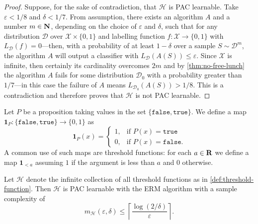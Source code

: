 \begin{proof}
    Suppose, for the sake of contradiction, that \(\mathcal{H}\) is PAC learnable. Take
    \(\varepsilon < 1/8\) and \(\delta < 1/7\). From assumption, there exists an algorithm
    \(A\) and a number \(m \in \mathbf{N}\), depending on the choice of \(\varepsilon\) and
    \(\delta\), such that for any distribution \(\mathcal{D}\) over
    \(\mathcal{X} \times \{0, 1\}\) and labelling function
    \(f: \mathcal{X} \to \{0, 1\}\) with \(L_{\mathcal{D}}(f) = 0\)---then, with a probability of at least
    \(1 - \delta\) over a sample \(S \sim \mathcal{D}^m\), the algorithm \(A\) will output a
    classifier with \(L_{\mathcal{D}}(A(S)) \leq \varepsilon\). Since
    \(\mathcal{X}\) is infinite, then certainly its cardinality overcomes \(2 m\) and by
    \cref{thm:no-free-lunch} the algorithm \(A\) fails for some distribution
    \(\mathcal{D}_0\) with a probability greater than \(1/7\)---in this case the failure of
    \(A\) means \(L_{\mathcal{D}_0}(A(S)) > 1/8\). This is a contradiction and therefore
    proves that \(\mathcal{H}\) is not PAC learnable.
\end{proof}

\begin{definition}
    \label{def:threshold-function}
    Let \(P\) be a proposition taking values in the set
    \(\{\texttt{false}, \texttt{true}\}\). We define a map
    \(\mathbf{1}_P: \{\texttt{false}, \texttt{true}\} \to \{0, 1\}\) as
    \[
        \mathbf{1}_P(x) =
        \begin{cases}
            1, & \text{if } P(x) = \texttt{true}   \\
            0, & \text{if } P(x) = \texttt{false}.
        \end{cases}
    \]
    A common use of such maps are threshold functions: for each \(a \in \mathbf{R}\) we define
    a map \(\mathbf{1}_{< a}\) assuming \(1\) if the argument is less than \(a\) and
    \(0\) otherwise.
\end{definition}

\begin{lemma}
    \label{lem:threshold-functions-pac-learnable}
    Let \(\mathcal{H}\) denote the infinite collection of all threshold functions as in
    \cref{def:threshold-function}. Then \(\mathcal{H}\) is PAC learnable with the ERM
    algorithm with a sample complexity of
    \[
        m_{\mathcal{H}}(\varepsilon, \delta) \leq \left\lceil \frac{\log(2/\delta)}{\varepsilon} \right\rceil.
    \]
\end{lemma}


